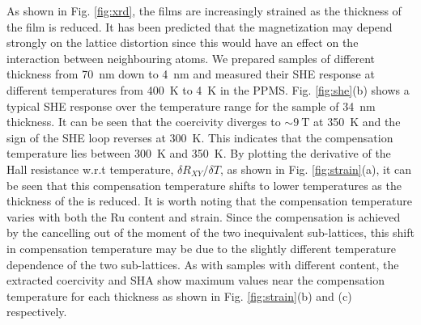 \documentclass[reprint,aip,apl,floatfix,linenumbers,superscriptaddress]{revtex4-1}
\begin{document}
As shown in Fig. \ref{fig:xrd}, the  films are increasingly strained as the thickness of the film is reduced. It has been predicted that the magnetization may depend strongly on the lattice distortion since this would have an effect on the interaction between neighbouring  atoms. We prepared  samples of different thickness from \SI{70}{\nano\metre} down to \SI{4}{\nano\metre} and measured their SHE response at different temperatures from \SI{400}{\kelvin} to \SI{4}{\kelvin} in the PPMS. Fig. \ref{fig:she}(b) shows a typical SHE response over the temperature range for the sample of \SI{34}{\nano\metre} thickness. It can be seen that the coercivity diverges to $\sim\SI{9}{\tesla}$ at \SI{350}{\kelvin} and the sign of the SHE loop reverses at \SI{300}{\kelvin}. This indicates that the compensation temperature lies between \SI{300}{\kelvin} and \SI{350}{\kelvin}.  By plotting the derivative of the Hall resistance w.r.t temperature, $\delta R_{XY}/\delta T$, as shown in Fig. \ref{fig:strain}(a), it can be seen that this compensation temperature shifts to lower temperatures as the thickness of the  is reduced. It is worth noting that the compensation temperature varies with both the Ru content and strain. Since the compensation is achieved by the cancelling out of the moment of the two inequivalent  sub-lattices, this shift in compensation temperature may be due to the slightly different temperature dependence of the two sub-lattices. As with samples with different  content, the extracted coercivity and SHA show maximum values near the compensation temperature for each thickness as shown in Fig. \ref{fig:strain}(b) and (c) respectively.
\end{document}
